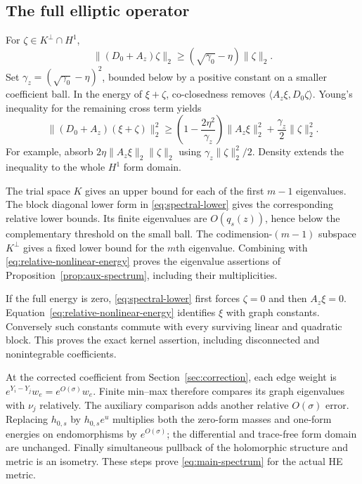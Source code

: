 \documentclass[11pt]{amsart}
\theoremstyle{definition}
\theoremstyle{remark}
\begin{document}
\subsection{The full elliptic operator}
For $\zeta\in K^\perp\cap H^1$,
\[
 \|(D_0+A_z)\zeta\|_2\ge(\sqrt{\gamma_0}-\eta)\|\zeta\|_2.
\]
Set $\gamma_z=(\sqrt{\gamma_0}-\eta)^2$, bounded below by a positive
constant on a smaller coefficient ball. In the energy of $\xi+\zeta$,
co-closedness removes $\langle A_z\xi,D_0\zeta\rangle$. Young's
inequality for the remaining cross term yields
\begin{equation}\label{eq:spectral-lower}
 \|(D_0+A_z)(\xi+\zeta)\|_2^2
 \ge\left(1-\frac{2\eta^2}{\gamma_z}\right)\|A_z\xi\|_2^2
      +\frac{\gamma_z}{2}\|\zeta\|_2^2.
\end{equation}
For example, absorb $2\eta\|A_z\xi\|_2\|\zeta\|_2$ using
$\gamma_z\|\zeta\|_2^2/2$. Density extends the inequality to the
whole $H^1$ form domain.

The trial space $K$ gives an upper bound for each of the first $m-1$
eigenvalues. The block diagonal lower form in \eqref{eq:spectral-lower}
gives the corresponding relative lower bounds. Its finite eigenvalues
are $O(q_s(z))$, hence below the complementary threshold on the small
ball. The codimension-$(m-1)$ subspace $K^\perp$ gives a fixed lower
bound for the $m$th eigenvalue. Combining with
\eqref{eq:relative-nonlinear-energy} proves the eigenvalue assertions
of Proposition~\ref{prop:aux-spectrum}, including their multiplicities.

If the full energy is zero, \eqref{eq:spectral-lower} first forces
$\zeta=0$ and then $A_z\xi=0$. Equation~\eqref{eq:relative-nonlinear-energy}
identifies $\xi$ with graph constants. Conversely such constants commute
with every surviving linear and quadratic block. This proves the exact
kernel assertion, including disconnected and nonintegrable coefficients.

At the corrected coefficient from Section~\ref{sec:correction}, each edge
weight is $e^{Y_i-Y_j}w_e=e^{O(\sigma)}w_e$. Finite min--max therefore
compares its graph eigenvalues with $\nu_j$ relatively. The auxiliary
comparison adds another relative $O(\sigma)$ error. Replacing $h_{0,s}$
by $h_{0,s}e^u$ multiplies both the zero-form masses and one-form energies
on endomorphisms by $e^{O(\sigma)}$; the differential and trace-free form
domain are unchanged. Finally simultaneous pullback of the holomorphic
structure and metric is an isometry. These steps prove
\eqref{eq:main-spectrum} for the actual HE metric.
\end{document}
